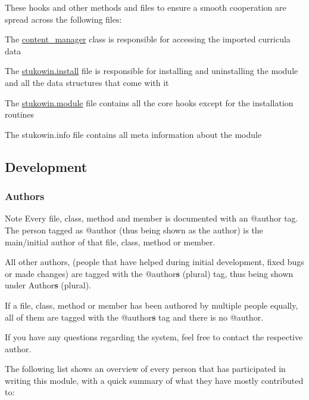 These hooks and other methods and files to ensure a smooth cooperation are spread across the following files\+:
\begin{DoxyItemize}
\item The \hyperlink{classcontent__manager}{content\+\_\+manager} class is responsible for accessing the imported curricula data
\item The \hyperlink{stukowin_8install}{stukowin.\+install} file is responsible for installing and uninstalling the module and all the data structures that come with it
\item The \hyperlink{stukowin_8module}{stukowin.\+module} file contains all the core hooks except for the installation routines
\item The stukowin.\+info file contains all meta information about the module
\end{DoxyItemize}\hypertarget{index_Development}{}\subsection{Development}\label{index_Development}
\hypertarget{index_Authors}{}\subsubsection{Authors}\label{index_Authors}
\begin{DoxyNote}{Note}
Every file, class, method and member is documented with an {\ttfamily @author} tag. The person tagged as {\ttfamily @author} (thus being shown as the author) is the main/initial author of that file, class, method or member. 

All other authors, (people that have helped during initial development, fixed bugs or made changes) are tagged with the {\ttfamily @author{\bfseries s} }(plural) tag, thus being shown under Author{\bfseries s} {\bfseries }(plural). 

If a file, class, method or member has been authored by multiple people equally, all of them are tagged with the {\ttfamily @author{\bfseries s} tag} and there is no {\ttfamily @author}. 

If you have any questions regarding the system, feel free to contact the respective author.
\end{DoxyNote}
The following list shows an overview of every person that has participated in writing this module, with a quick summary of what they have mostly contributed to\+:
